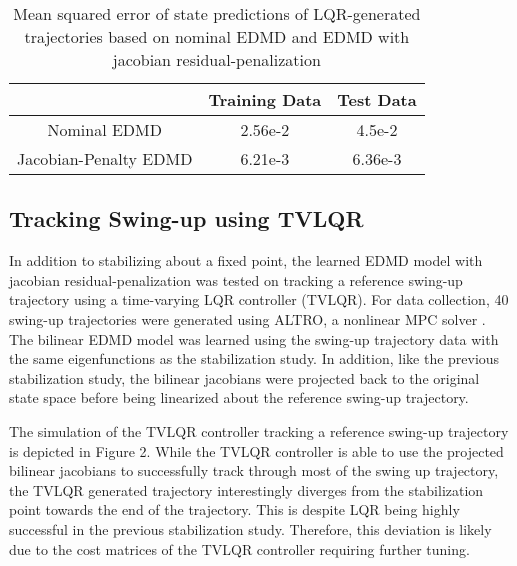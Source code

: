 \documentclass{article}
\begin{document}
    \begin{table}[h]
    \begin{center}
    \begin{tabular}{|c|c c|}
    \hline
     & Training Data & Test Data\\
    \hline
    Nominal EDMD & 2.56e-2 & 4.5e-2\\
    Jacobian-Penalty EDMD & 6.21e-3 & 6.36e-3\\
    \hline
    \end{tabular}
    \end{center}
    \caption{Mean squared error of state predictions of LQR-generated trajectories based on nominal EDMD and EDMD with jacobian residual-penalization}
    \end{table}
    
    
    \subsection{Tracking Swing-up using TVLQR}
    
    In addition to stabilizing about a fixed point, the learned EDMD model with jacobian residual-penalization was tested on tracking a reference swing-up trajectory using a time-varying LQR controller (TVLQR). For data collection, 40 swing-up trajectories were generated using ALTRO, a nonlinear MPC solver \cite{13}. The bilinear EDMD model was learned using the swing-up trajectory data with the same eigenfunctions as the stabilization study. In addition, like the previous stabilization study, the bilinear jacobians were projected back to the original state space before being linearized about the reference swing-up trajectory.
    
    The simulation of the TVLQR controller tracking a reference swing-up trajectory is depicted in Figure 2. While the TVLQR controller is able to use the projected bilinear jacobians to successfully track through most of the swing up trajectory, the TVLQR generated trajectory interestingly diverges from the stabilization point towards the end of the trajectory. This is despite LQR being highly successful in the previous stabilization study. Therefore, this deviation is likely due to the cost matrices of the TVLQR controller requiring further tuning.
    
\end{document}
